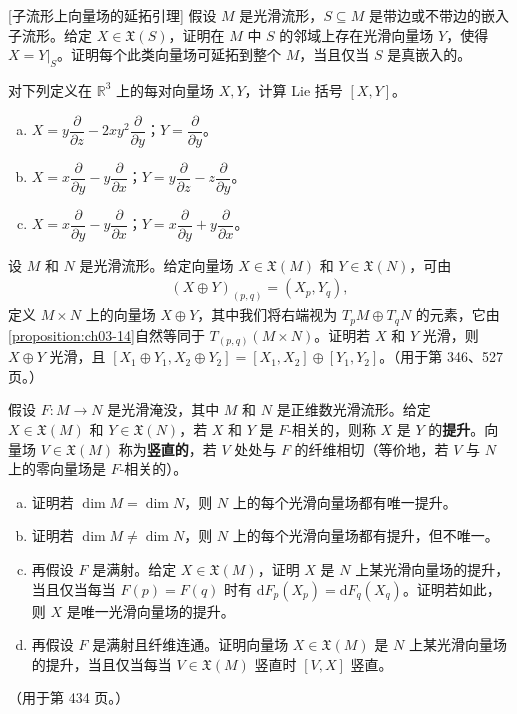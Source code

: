 \documentclass[../../main.tex]{subfiles}
\begin{document}
\begin{exercise}\label{exercise:ch08-15}[子流形上向量场的延拓引理]
假设 $M$ 是光滑流形，$S\subseteq M$ 是带边或不带边的嵌入子流形。给定 $X\in\mathfrak{X}(S)$，证明在 $M$ 中 $S$ 的邻域上存在光滑向量场 $Y$，使得 $X=Y|_S$。证明每个此类向量场可延拓到整个 $M$，当且仅当 $S$ 是真嵌入的。
\end{exercise}

\begin{exercise}\label{exercise:ch08-16}
对下列定义在 $\mathbb{R}^3$ 上的每对向量场 $X,Y$，计算 Lie 括号 $[X,Y]$。
\begin{enumerate}[(a)]
\item $X=y\dfrac{\partial}{\partial z}-2xy^2\dfrac{\partial}{\partial y}$；$Y=\dfrac{\partial}{\partial y}$。
\item $X=x\dfrac{\partial}{\partial y}-y\dfrac{\partial}{\partial x}$；$Y=y\dfrac{\partial}{\partial z}-z\dfrac{\partial}{\partial y}$。
\item $X=x\dfrac{\partial}{\partial y}-y\dfrac{\partial}{\partial x}$；$Y=x\dfrac{\partial}{\partial y}+y\dfrac{\partial}{\partial x}$。
\end{enumerate}
\end{exercise}

\begin{exercise}\label{exercise:ch08-17}
设 $M$ 和 $N$ 是光滑流形。给定向量场 $X\in\mathfrak{X}(M)$ 和 $Y\in\mathfrak{X}(N)$，可由
\begin{align*}
(X\oplus Y)_{(p,q)}=(X_p,Y_q),
\end{align*}
定义 $M\times N$ 上的向量场 $X\oplus Y$，其中我们将右端视为 $T_pM\oplus T_qN$ 的元素，它由\cref{proposition:ch03-14}自然等同于 $T_{(p,q)}(M\times N)$。证明若 $X$ 和 $Y$ 光滑，则 $X\oplus Y$ 光滑，且 $[X_1\oplus Y_1,X_2\oplus Y_2]=[X_1,X_2]\oplus[Y_1,Y_2]$。（用于第 346、527 页。）
\end{exercise}

\begin{exercise}\label{exercise:ch08-18}
假设 $F\colon M\to N$ 是光滑淹没，其中 $M$ 和 $N$ 是正维数光滑流形。给定 $X\in\mathfrak{X}(M)$ 和 $Y\in\mathfrak{X}(N)$，若 $X$ 和 $Y$ 是 $F$-相关的，则称 $X$ 是 $Y$ 的\textbf{提升}。向量场 $V\in\mathfrak{X}(M)$ 称为\textbf{竖直的}，若 $V$ 处处与 $F$ 的纤维相切（等价地，若 $V$ 与 $N$ 上的零向量场是 $F$-相关的）。
\begin{enumerate}[(a)]
\item 证明若 $\dim M=\dim N$，则 $N$ 上的每个光滑向量场都有唯一提升。
\item 证明若 $\dim M\neq\dim N$，则 $N$ 上的每个光滑向量场都有提升，但不唯一。
\item 再假设 $F$ 是满射。给定 $X\in\mathfrak{X}(M)$，证明 $X$ 是 $N$ 上某光滑向量场的提升，当且仅当每当 $F(p)=F(q)$ 时有 $\mathrm{d}F_p(X_p)=\mathrm{d}F_q(X_q)$。证明若如此，则 $X$ 是唯一光滑向量场的提升。
\item 再假设 $F$ 是满射且纤维连通。证明向量场 $X\in\mathfrak{X}(M)$ 是 $N$ 上某光滑向量场的提升，当且仅当每当 $V\in\mathfrak{X}(M)$ 竖直时 $[V,X]$ 竖直。
\end{enumerate}
（用于第 434 页。）
\end{exercise}
\end{document}
